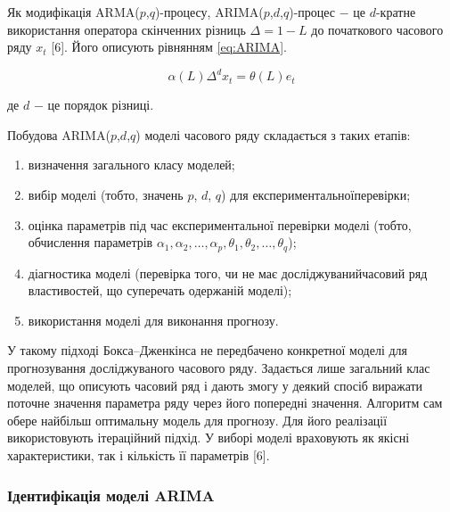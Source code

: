 Як модифікація ARMA($p$,$q$)-процесу, ARIMA($p$,$d$,$q$)-процес $-$ це $d$-кратне використання оператора скінченних різниць $\Delta=1-L$ до початкового часового ряду $x_{t}$ [6]. Його описують рівнянням \ref{eq:ARIMA}.

\begin{equation}\label{eq:ARIMA}
\alpha(L)\Delta^{d}x_{t} = \theta(L)e_{t}
\end{equation}

\noindent де $d$ $-$ це порядок різниці.

\vspace{1.5em}

Побудова ARIMA($p$,$d$,$q$) моделі часового ряду складається з таких етапів:

\begin{enumerate}
	\item визначення загального класу моделей;
	\item вибір моделі (тобто, значень $p$, $d$, $q$) для експериментальної\newline \hspace*{-18mm}перевірки;
	\item оцінка параметрів під час експериментальної перевірки моделі\newline 
\hspace*{-18mm}(тобто, обчислення параметрів $\alpha_{1}, \alpha_{2}, \dots, \alpha_{p}, \theta_{1}, \theta_{2}, \dots, \theta_{q}$);
	\item діагностика моделі (перевірка того, чи не має досліджуваний\newline \hspace*{-18mm}часовий ряд властивостей, що суперечать одержаній моделі);
	\item використання моделі для виконання прогнозу. 
\end{enumerate}

У такому підході Бокса–Дженкінса не передбачено конкретної моделі для прогнозування досліджуваного часового ряду. Задається лише загальний клас моделей, що описують часовий ряд і дають змогу у деякий спосіб виражати поточне значення параметра ряду через його попередні значення. Алгоритм сам обере найбільш оптимальну модель для прогнозу. Для його реалізації використовують ітераційний підхід. У виборі моделі враховують як якісні характеристики, так і кількість її параметрів [6]. 

\subsubsection{Ідентифікація моделі ARIMA}

